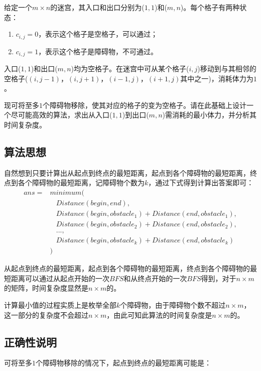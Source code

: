 \documentclass{article}
\begin{document}
给定一个$m\times{n}$的迷宫，其入口和出口分别为($1,1$)和($m,n$)。每个格子有两种状态：

\begin{enumerate}[itemindent=3em]
    \item $c_{i,j}=0$，表示这个格子是空格子，可以通过；
    \item $c_{i,j}=1$，表示这个格子是障碍物，不可通过。
\end{enumerate}

入口($1,1$)和出口($m,n$)均为空格子。在迷宫中可从某个格子($i,j$)移动到与其相邻的空格子($(i,j−1)$，$(i,j+1)$，$(i−1,j)$，$(i+1,j)$其中之一)，消耗体力为$1$。

现可将至多$1$个障碍物移除，使其对应的格子的变为空格子。请在此基础上设计一个尽可能高效的算法，求出从入口($1,1$)到出口($m,n$)需消耗的最小体力，并分析其时间复杂度。

\subsection{算法思想}

自然想到只要计算出从起点到终点的最短距离，起点到各个障碍物的最短距离，终点到各个障碍物的最短距离，记障碍物个数为$k$，通过下式得到计算出答案即可：
\begin{align*}
ans= & minimum(\\
& \ \ \ \ Distance(begin,end),\\
& \ \ \ \ Distance(begin,obstacle_1)+Distance(end,obstacle_1),\\
& \ \ \ \ Distance(begin,obstacle_2)+Distance(end,obstacle_2),\\
& \ \ \ \ ...,\\
& \ \ \ \ Distance(begin,obstacle_k)+Distance(end,obstacle_k)\\
& )
\end{align*}

从起点到终点的最短距离，起点到各个障碍物的最短距离，终点到各个障碍物的最短距离可以通过从起点开始的一次$BFS$和从终点开始的一次$BFS$得到，对于$n\times{m}$的矩阵，时间复杂度显然是$n\times{m}$的。

计算最小值的过程实质上是枚举全部$k$个障碍物，由于障碍物个数不超过$n\times{m}$，这一部分的复杂度不会超过$n\times{m}$，由此可知此算法的时间复杂度是$n\times{m}$的。

\subsection{正确性说明}

可将至多$1$个障碍物移除的情况下，起点到终点的最短距离可能是：
\end{document}
